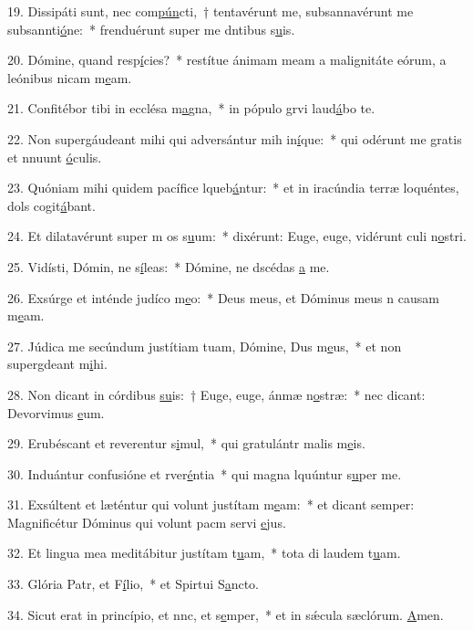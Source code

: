 19. Dissipáti sunt, nec com\uline{pún}cti,~† tentavérunt me, subsannavérunt me subsannti\uline{ó}ne:~* frenduérunt super me dntibus s\uline{u}is.\par 
20. Dómine, quand resp\uline{í}cies?~* restítue ánimam meam a malignitáte eórum, a leónibus nicam m\uline{e}am.\par 
21. Confitébor tibi in ecclésa m\uline{a}gna,~* in pópulo grvi laud\uline{á}bo te.\par 
22. Non supergáudeant mihi qui adversántur mih in\uline{í}que:~* qui odérunt me gratis et nnuunt \uline{ó}culis.\par 
23. Quóniam mihi quidem pacífice lqueb\uline{á}ntur:~* et in iracúndia terræ loquéntes, dols cogit\uline{á}bant.\par 
24. Et dilatavérunt super m os s\uline{u}um:~* dixérunt: Euge, euge, vidérunt culi n\uline{o}stri.\par 
25. Vidísti, Dómin, ne s\uline{í}leas:~* Dómine, ne dscédas \uline{a} me.\par 
26. Exsúrge et inténde judíco m\uline{e}o:~* Deus meus, et Dóminus meus n causam m\uline{e}am.\par 
27. Júdica me secúndum justítiam tuam, Dómine, Dus m\uline{e}us,~* et non supergdeant m\uline{i}hi.\par 
28. Non dicant in córdibus \uline{su}is:~† Euge, euge, ánmæ n\uline{o}stræ:~* nec dicant: Devorvimus \uline{e}um.\par 
29. Erubéscant et reverentur s\uline{i}mul,~* qui gratulántr malis m\uline{e}is.\par 
30. Induántur confusióne et rver\uline{é}ntia~* qui magna lquúntur s\uline{u}per me.\par 
31. Exsúltent et læténtur qui volunt justítam m\uline{e}am:~* et dicant semper: Magnificétur Dóminus qui volunt pacm servi \uline{e}jus.\par 
32. Et lingua mea meditábitur justítam t\uline{u}am,~* tota di laudem t\uline{u}am.\par 
33. Glória Patr, et F\uline{í}lio,~* et Spirtui S\uline{a}ncto.\par 
34. Sicut erat in princípio, et nnc, et s\uline{e}mper,~* et in sǽcula sæclórum. \uline{A}men.\par 
